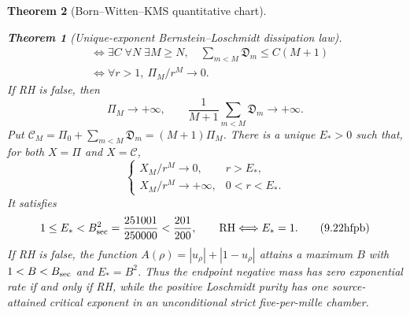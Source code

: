 \documentclass[11pt]{article}
\newtheorem{theorem}{Theorem}[section]
\begin{document}
\begin{theorem}[Born--Witten--KMS quantitative chart]
\begin{theorem}[Unique-exponent Bernstein--Loschmidt dissipation law]
\[\begin{aligned}
 &\Longleftrightarrow
 \exists C\;\forall N\;\exists M\ge N,\quad
 \sum_{m<M}\mathfrak D_m\le C(M+1)\\
 &\Longleftrightarrow \forall r>1,\ \Pi_M/r^M\to0.
 \end{aligned}
 \tag{9.22hfo}
\]
If RH is false, then
\[
 \Pi_M\longrightarrow+\infty,
 \qquad
 \frac1{M+1}\sum_{m<M}\mathfrak D_m\longrightarrow+\infty.
 \tag{9.22hfoa}
\]
Put $\mathcal C_M=\Pi_0+\sum_{m<M}\mathfrak D_m=(M+1)\Pi_M$.  There is a unique
$E_*>0$ such that, for both $X=\Pi$ and $X=\mathcal C$,
\[
 \begin{cases}
 X_M/r^M\to0,&r>E_*,\\
 X_M/r^M\to+\infty,&0<r<E_*.
 \end{cases}
 \tag{9.22hfp}
\]
It satisfies
\[
 1\le E_*<B_{\rm sec}^2=\frac{251001}{250000}<\frac{201}{200},
 \qquad \mathrm{RH}\Longleftrightarrow E_*=1.
 \tag{9.22hfpb}
\]
If RH is false, the function $A(\rho)=|u_\rho|+|1-u_\rho|$ attains a maximum $B$ with
$1<B<B_{\rm sec}$ and $E_*=B^2$.  Thus the endpoint negative mass has zero exponential rate if
and only if RH, while the positive Loschmidt purity has one source-attained critical exponent in
an unconditional strict five-per-mille chamber.
\end{theorem}


\end{theorem}
\end{document}
